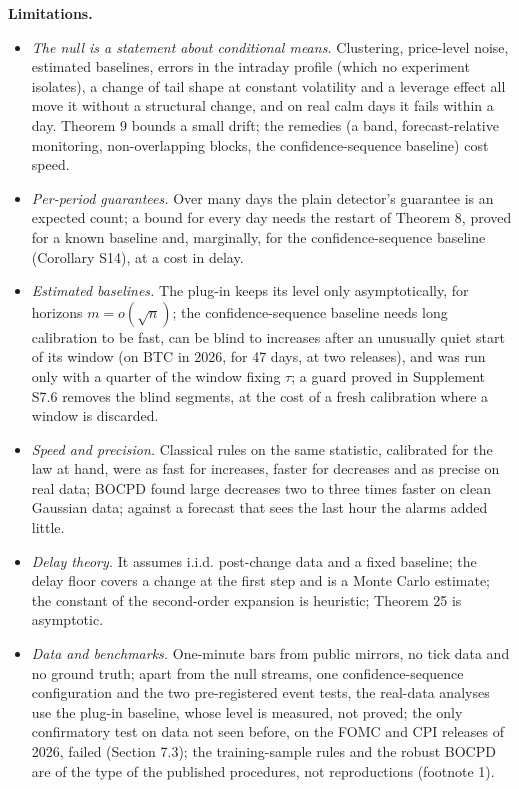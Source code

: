 \documentclass[
]{article}
\providecommand{\tightlist}{%
  \setlength{\itemsep}{0pt}\setlength{\parskip}{0pt}}
\begin{document}
\textbf{Limitations.}

\begin{itemize}
\tightlist
\item
  \emph{The null is a statement about conditional means.} Clustering,
  price-level noise, estimated baselines, errors in the intraday profile
  (which no experiment isolates), a change of tail shape at constant
  volatility and a leverage effect all move it without a structural
  change, and on real calm days it fails within a day. Theorem 9 bounds
  a small drift; the remedies (a band, forecast-relative monitoring,
  non-overlapping blocks, the confidence-sequence baseline) cost speed.
\item
  \emph{Per-period guarantees.} Over many days the plain detector's
  guarantee is an expected count; a bound for every day needs the
  restart of Theorem 8, proved for a known baseline and, marginally, for
  the confidence-sequence baseline (Corollary S14), at a cost in delay.
\item
  \emph{Estimated baselines.} The plug-in keeps its level only
  asymptotically, for horizons \(m = o(\sqrt n)\); the
  confidence-sequence baseline needs long calibration to be fast, can be
  blind to increases after an unusually quiet start of its window (on
  BTC in 2026, for 47 days, at two releases), and was run only with a
  quarter of the window fixing \(\tau\); a guard proved in Supplement
  S7.6 removes the blind segments, at the cost of a fresh calibration
  where a window is discarded.
\item
  \emph{Speed and precision.} Classical rules on the same statistic,
  calibrated for the law at hand, were as fast for increases, faster for
  decreases and as precise on real data; BOCPD found large decreases two
  to three times faster on clean Gaussian data; against a forecast that
  sees the last hour the alarms added little.
\item
  \emph{Delay theory.} It assumes i.i.d. post-change data and a fixed
  baseline; the delay floor covers a change at the first step and is a
  Monte Carlo estimate; the constant of the second-order expansion is
  heuristic; Theorem 25 is asymptotic.
\item
  \emph{Data and benchmarks.} One-minute bars from public mirrors, no
  tick data and no ground truth; apart from the null streams, one
  confidence-sequence configuration and the two pre-registered event
  tests, the real-data analyses use the plug-in baseline, whose level is
  measured, not proved; the only confirmatory test on data not seen
  before, on the FOMC and CPI releases of 2026, failed (Section 7.3);
  the training-sample rules and the robust BOCPD are of the type of the
  published procedures, not reproductions (footnote 1).
\end{itemize}
\end{document}

